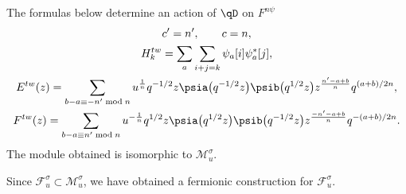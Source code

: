 \begin{Theorem}\label{TheFermionicTh}
The formulas below determine an action of $\qD$ on $F^{n\psi}$
\begin{gather}
c' = n', \qquad c=n,\nonumber\\
H^{tw}_k = \sum_{a} \sum_{i+j=k} \psi_a [i] \psi^*_a [j] , \nonumber\\
E^{tw}(z) = \sum_{b-a \equiv -n' \bmod n} u^{\frac{1}{n}} q^{-1/2} z \psia \big( q^{-1/2} z\big) \psib \big(q^{1/2} z\big) z^{\frac{n'-a+b}{n}} q^{(a+b)/2n}, \label{eq:EtwFermi} \\
F^{tw}(z) = \sum_{b-a \equiv n' \bmod n} u^{-\frac{1}{n}} q^{1/2} z \psia \big( q^{1/2} z\big) \psib \big(q^{-1/2} z\big) z^{\frac{-n'-a+b}{n}} q^{-(a+b)/2n}. \nonumber %
\end{gather}
The module obtained is isomorphic to $\mathcal{M}_u^{\sigma}$.
\end{Theorem}
Since $\mathcal{F}_u^{\sigma} \subset \mathcal{M}_u^{\sigma}$, we have obtained a fermionic construction for $\mathcal{F}_u^{\sigma}$.
